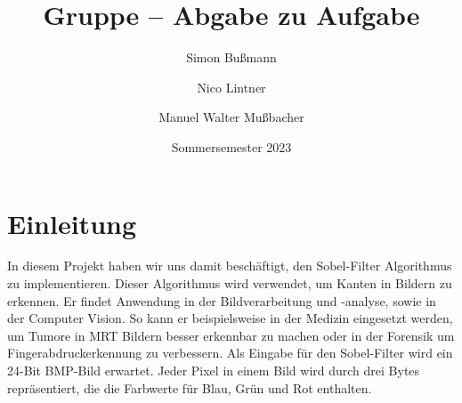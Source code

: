 \documentclass[course=erap]{aspdoc}
\author{Simon Bußmann \and Nico Lintner \and Manuel Walter Mußbacher}
\date{Sommersemester 2023}
\title{Gruppe \theGroup{} -- Abgabe zu Aufgabe \theNumber}
\begin{document}
\maketitle

\section{Einleitung}
In diesem Projekt haben wir uns damit beschäftigt, den Sobel-Filter Algorithmus zu implementieren.
Dieser Algorithmus wird verwendet, um Kanten in Bildern zu erkennen.
Er findet Anwendung in der Bildverarbeitung und -analyse, sowie in der Computer Vision.
So kann er beispielsweise in der Medizin eingesetzt werden, um Tumore in MRT Bildern besser erkennbar zu machen \cite{7002427}
oder in der Forensik um Fingerabdruckerkennung zu verbessern. \cite{6900702}
Als Eingabe für den Sobel-Filter wird ein 24-Bit BMP-Bild erwartet.
Jeder Pixel in einem Bild wird durch drei Bytes repräsentiert, die die Farbwerte für Blau, Grün und Rot enthalten.
\end{document}
